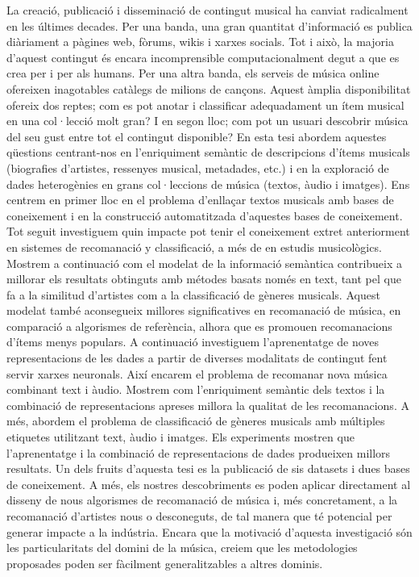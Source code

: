La creació, publicació i disseminació de contingut musical ha canviat radicalment en les últimes decades. Per una banda, una gran quantitat d’informació es publica diàriament a pàgines web, fòrums, wikis i xarxes socials. Tot i això, la majoria d’aquest contingut és encara incomprensible computacionalment degut a que es crea per i per als humans. Per una altra banda, els serveis de música online ofereixen inagotables catàlegs de milions de cançons. Aquest àmplia disponibilitat ofereix dos reptes; com es pot anotar i classificar adequadament un ítem musical en una col·lecció molt gran? I en segon lloc; com pot un usuari descobrir música del seu gust entre tot el contingut disponible? En esta tesi abordem aquestes qüestions centrant-nos en l’enriquiment semàntic de descripcions d’ítems musicals (biografies d’artistes, ressenyes musical, metadades, etc.) i en la exploració de dades heterogènies en grans col·leccions de música (textos, àudio i imatges). Ens centrem en primer lloc en el problema d’enllaçar textos musicals amb bases de coneixement i en la construcció automatitzada d’aquestes bases de coneixement.
Tot seguit investiguem quin impacte pot tenir el coneixement extret anteriorment en sistemes de recomanació y classificació, a més de en estudis musicològics. Mostrem a continuació com el modelat de la informació semàntica contribueix a millorar els resultats obtinguts amb métodes basats només en text, tant pel que fa a la similitud d’artistes com a la classificació de gèneres musicals.  Aquest modelat també aconsegueix millores significatives en recomanació de música, en comparació a algorismes de referència, alhora que es promouen recomanacions d’ítems menys populars. A continuació investiguem l'aprenentatge de noves representacions de les dades a partir de diverses modalitats de contingut fent servir xarxes neuronals. Així encarem el problema de recomanar nova música combinant text i àudio. Mostrem com l’enriquiment semàntic dels textos i la combinació de representacions apreses millora la qualitat de les recomanacions. A més, abordem el problema de classificació de gèneres musicals amb múltiples etiquetes utilitzant text, àudio i imatges. Els experiments mostren que l’aprenentatge i la combinació de representacions de dades produeixen millors resultats. Un dels fruits d’aquesta tesi es la publicació de sis datasets i dues bases de coneixement. A més, els nostres descobriments es poden aplicar directament al disseny de nous algorismes de recomanació de música i, més concretament, a la recomanació d’artistes nous o desconeguts, de tal manera que té potencial per generar impacte a la indústria. Encara que la motivació d’aquesta investigació són les particularitats del domini de la música, creiem que les metodologies proposades poden ser fàcilment generalitzables a altres dominis.  
